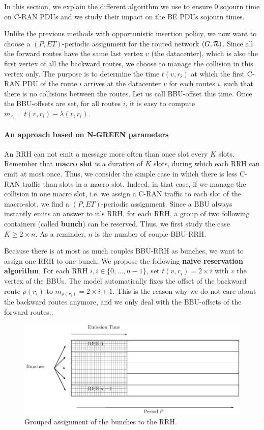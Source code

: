 \documentclass[a4paper,10pt,english]{article}
\begin{document}
In this section, we explain the different algorithm we use to ensure $0$ sojourn time on C-RAN PDUs and we study their impact on the BE PDUs sojourn times.
  
Unlike the previous methods with opportunistic insertion policy, we now want to choose a $(P,ET)$-periodic assignment for the routed network $(G,{\cal R})$. Since all the forward routes have the same last vertex $v$ (the datacenter), which is also the first vertex of all the backward routes, we choose to manage the collision in this vertex only. The purpose is to determine the time $t(v,r_i)$ at which the first C-RAN PDU of the route $i$ arrives at the datacenter $v$ for each routes $i$, such that there is no collisions between the routes. Let us call BBU-offset this time. Once the BBU-offsets are set, for all routes $i$, it is easy to compute $m_{r_i} = t(v,r_i) - \lambda(v,r_i)$.


\paragraph{An approach based on N-GREEN parameters}
An RRH can not emit a message more often than once slot every $K$ slots. Remember that {\bf macro slot} is a duration of $K$ slots, during which each RRH can emit at most once. Thus, we consider the simple case in which there is less C-RAN traffic than slots in a macro slot. Indeed, in that case, if we manage the collision in one macro slot, i.e. we assign a C-RAN traffic to each slot of the macro-slot, we find a  $(P,ET)$-periodic assignment. Since a BBU always instantly emits an answer to it's RRH, for each RRH, a group of two following containers (called {\bf bunch}) can be reserved. Thus, we first study the case $K \ge 2\times n$. As a reminder, $n$ is the number of couple BBU-RRH. 

 
 Because there is at most as much couples BBU-RRH as bunches, we want to assign one RRH to one bunch.
We propose the following {\bf naive reservation algorithm}. For each RRH $i, i\in \{0,...,n-1\} $, set $t(v,r_i)= 2\times i$ with $v$ the vertex of the BBUs. The model automatically fixes the offset of the backward route $\rho(r_i)$ to $m_{\rho(r_i)}= 2\times i +1$. This is the reason why we do not care about the backward routes anymore, and we only deal with the BBU-offsets of the forward routes..
   \begin{figure}[h]

      \includegraphics[scale=0.7]{freqgrouped.pdf}
     \caption{Grouped assignment of the bunches to the RRH.}   \label{fig:freqG}
  \end{figure}
\end{document}
